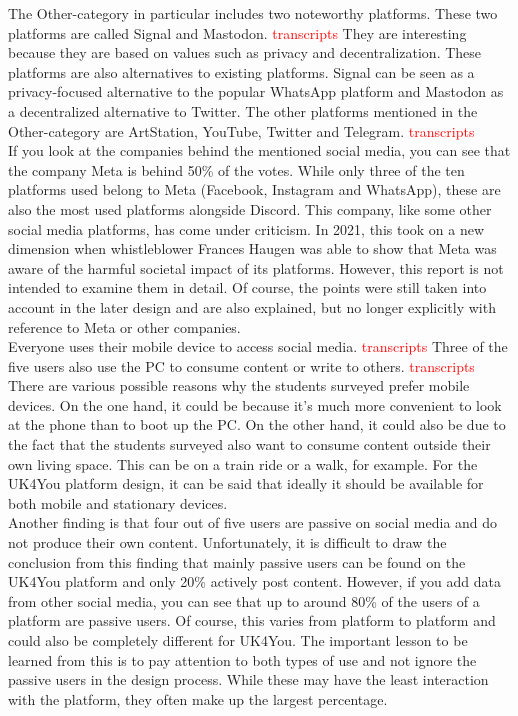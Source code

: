 The Other-category in particular includes two noteworthy platforms.
These two platforms are called Signal and Mastodon\cite{signal}\cite{mastodon}. \textcolor{red}{transcripts}
They are interesting because they are based on values such as privacy and decentralization.
These platforms are also alternatives to existing platforms.
Signal can be seen as a privacy-focused alternative to the popular WhatsApp platform and Mastodon as a decentralized alternative to Twitter.
The other platforms mentioned in the Other-category are ArtStation, YouTube, Twitter and Telegram. \textcolor{red}{transcripts}\\

If you look at the companies behind the mentioned social media, you can see that the company Meta is behind 50\% of the votes.
While only three of the ten platforms used belong to Meta (Facebook, Instagram and WhatsApp), these are also the most used platforms alongside Discord.
This company, like some other social media platforms, has come under criticism.
In 2021, this took on a new dimension when whistleblower Frances Haugen was able to show that Meta was aware of the harmful societal impact of its platforms\cite{whistleblower-meta}.
However, this report is not intended to examine them in detail.
Of course, the points were still taken into account in the later design and are also explained, but no longer explicitly with reference to Meta or other companies.\\

Everyone uses their mobile device to access social media. \textcolor{red}{transcripts}
Three of the five users also use the PC to consume content or write to others. \textcolor{red}{transcripts}
There are various possible reasons why the students surveyed prefer mobile devices.
On the one hand, it could be because it's much more convenient to look at the phone than to boot up the PC.
On the other hand, it could also be due to the fact that the students surveyed also want to consume content outside their own living space.
This can be on a train ride or a walk, for example.
For the UK4You platform design, it can be said that ideally it should be available for both mobile and stationary devices.\\

Another finding is that four out of five users are passive on social media and do not produce their own content.
Unfortunately, it is difficult to draw the conclusion from this finding that mainly passive users can be found on the UK4You platform and only 20\% actively post content.
However, if you add data from other social media, you can see that up to around 80\% of the users of a platform are passive users.
Of course, this varies from platform to platform and could also be completely different for UK4You.
The important lesson to be learned from this is to pay attention to both types of use and not ignore the passive users in the design process.
While these may have the least interaction with the platform, they often make up the largest percentage.\\

